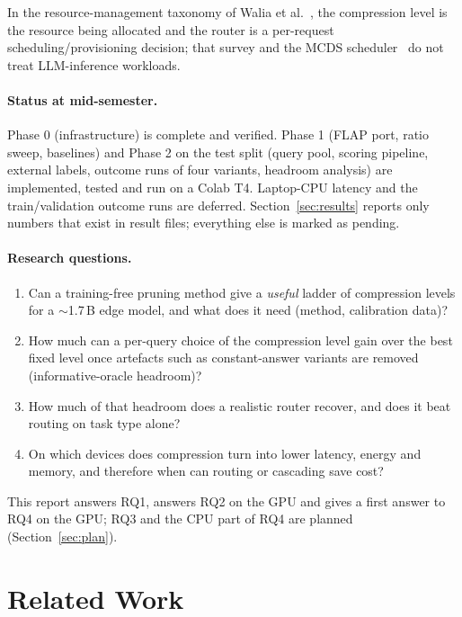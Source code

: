 \documentclass[11pt,a4paper]{article}
\begin{document}
In the resource-management taxonomy of Walia et al.~\citep{walia2024survey}, the compression level is
the resource being allocated and the router is a per-request scheduling/provisioning decision; that
survey and the MCDS scheduler~\citep{tuli2022mcds} do not treat LLM-inference workloads.

\paragraph{Status at mid-semester.} Phase 0 (infrastructure) is complete and verified. Phase 1 (FLAP port,
ratio sweep, baselines) and Phase 2 on the test split (query pool, scoring pipeline, external labels, outcome
runs of four variants, headroom analysis) are implemented, tested and run on a Colab T4. Laptop-CPU latency
and the train/validation outcome runs are deferred. Section~\ref{sec:results} reports only numbers that
exist in result files; everything else is marked as pending.

\paragraph{Research questions.}
\begin{enumerate}
  \item[RQ1] Can a training-free pruning method give a \emph{useful} ladder of compression levels for a
  $\sim$1.7\,B edge model, and what does it need (method, calibration data)?
  \item[RQ2] How much can a per-query choice of the compression level gain over the best fixed level once
  artefacts such as constant-answer variants are removed (informative-oracle headroom)?
  \item[RQ3] How much of that headroom does a realistic router recover, and does it beat routing on task type alone?
  \item[RQ4] On which devices does compression turn into lower latency, energy and memory, and therefore
  when can routing or cascading save cost?
\end{enumerate}
This report answers RQ1, answers RQ2 on the GPU and gives a first answer to RQ4 on the GPU; RQ3 and the
CPU part of RQ4 are planned (Section~\ref{sec:plan}).

\section{Related Work}
\label{sec:related}
\end{document}
